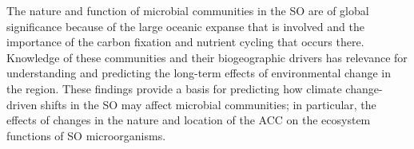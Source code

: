The nature and function of microbial communities in the \ac{SO} are of global significance because of the large oceanic expanse that is involved and the importance of the carbon fixation and nutrient cycling that occurs there.
Knowledge of these communities and their biogeographic drivers has relevance for understanding and predicting the long-term effects of environmental change in the region.
These findings provide a basis for predicting how climate change-driven shifts in the \ac{SO} may affect microbial communities; in particular, the effects of changes in the nature and location of the \ac{ACC} on the ecosystem functions of \ac{SO} microorganisms.
